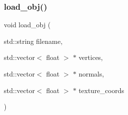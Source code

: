 \subsubsection{\texorpdfstring{load\+\_\+obj()}{load\_obj()}}
{\footnotesize\ttfamily void load\+\_\+obj (\begin{DoxyParamCaption}\item[{std\+::string}]{filename,  }\item[{std\+::vector$<$ float $>$ $\ast$}]{vertices,  }\item[{std\+::vector$<$ float $>$ $\ast$}]{normals,  }\item[{std\+::vector$<$ float $>$ $\ast$}]{texture\+\_\+coords }\end{DoxyParamCaption})}

